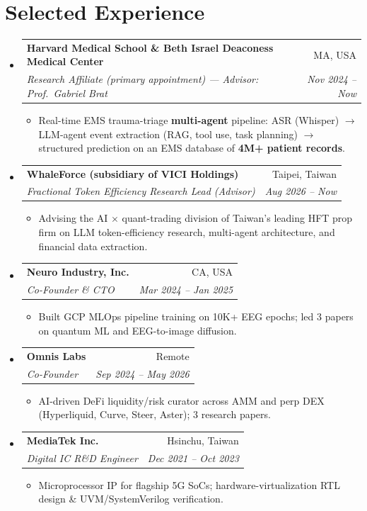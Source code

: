 \documentclass[letterpaper,9pt]{extarticle}
\makeatletter
\newcommand{\resumeItem}[1]{\item\small{{#1 \vspace{-2pt}}}}
\newcommand{\resumeSubheading}[4]{
  \vspace{-1pt}\item
    \begin{tabular*}{0.98\textwidth}[t]{l@{\extracolsep{\fill}}r}
      \textbf{#1} & #2 \\
      \textit{\small#3} & \textit{\small #4} \\
    \end{tabular*}\vspace{-6pt}
}
\newcommand{\resumeSubHeadingListStart}{\begin{itemize}[leftmargin=0.12in, label={}]}
\newcommand{\resumeSubHeadingListEnd}{\end{itemize}}
\newcommand{\resumeItemListStart}{\begin{itemize}[leftmargin=0.28in]}
\newcommand{\resumeItemListEnd}{\end{itemize}\vspace{-4pt}}
\makeatother
\begin{document}
\section{Selected Experience}
\resumeSubHeadingListStart
  \resumeSubheading
    {Harvard Medical School \& Beth Israel Deaconess Medical Center}{MA, USA}
    {Research Affiliate (primary appointment) — Advisor: Prof.\ Gabriel Brat}{Nov 2024 -- Now}
    \resumeItemListStart
      \resumeItem{Real-time EMS trauma-triage \textbf{multi-agent} pipeline: ASR (Whisper) $\rightarrow$ LLM-agent event extraction (RAG, tool use, task planning) $\rightarrow$ structured prediction on an EMS database of \textbf{4M+ patient records}.}
    \resumeItemListEnd
  \resumeSubheading
    {WhaleForce (subsidiary of VICI Holdings)}{Taipei, Taiwan}
    {Fractional Token Efficiency Research Lead (Advisor)}{Aug 2026 -- Now}
    \resumeItemListStart
      \resumeItem{Advising the AI $\times$ quant-trading division of Taiwan's leading HFT prop firm on LLM token-efficiency research, multi-agent architecture, and financial data extraction.}
    \resumeItemListEnd
  \resumeSubheading
    {Neuro Industry, Inc.}{CA, USA}
    {Co-Founder \& CTO}{Mar 2024 -- Jan 2025}
    \resumeItemListStart
      \resumeItem{Built GCP MLOps pipeline training on 10K+ EEG epochs; led 3 papers on quantum ML and EEG-to-image diffusion.}
    \resumeItemListEnd
  \resumeSubheading
    {Omnis Labs}{Remote}
    {Co-Founder}{Sep 2024 -- May 2026}
    \resumeItemListStart
      \resumeItem{AI-driven DeFi liquidity/risk curator across AMM and perp DEX (Hyperliquid, Curve, Steer, Aster); 3 research papers.}
    \resumeItemListEnd
  \resumeSubheading
    {MediaTek Inc.}{Hsinchu, Taiwan}
    {Digital IC R\&D Engineer}{Dec 2021 -- Oct 2023}
    \resumeItemListStart
      \resumeItem{Microprocessor IP for flagship 5G SoCs; hardware-virtualization RTL design \& UVM/SystemVerilog verification.}
    \resumeItemListEnd
\resumeSubHeadingListEnd

\end{document}
